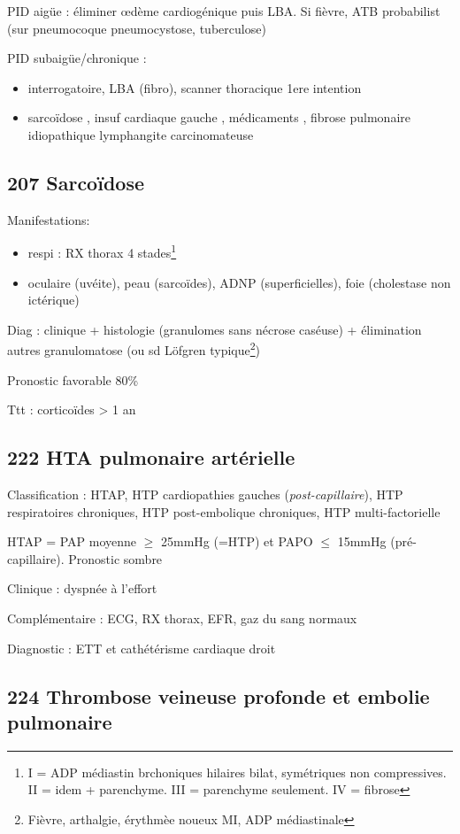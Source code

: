 \documentclass[11pt]{article}
\begin{document}
PID aigüe : éliminer \oe{}dème cardiogénique puis LBA. Si fièvre, ATB
probabilist (sur pneumocoque \textpm{} pneumocystose, tuberculose)

PID subaigüe/chronique : 
\begin{itemize}
\item interrogatoire, LBA (fibro), scanner thoracique 1ere intention
\item sarcoïdose , insuf cardiaque gauche , médicaments , fibrose pulmonaire idiopathique lymphangite carcinomateuse
\end{itemize}
\subsection{207 Sarcoïdose}
\label{sec:org4ff6054}
Manifestations: 
\begin{itemize}
\item respi : RX thorax 4 stades\footnote{I = ADP médiastin brchoniques hilaires bilat, symétriques non
compressives. II = idem + parenchyme. III = parenchyme seulement. IV = fibrose}
\item oculaire (uvéite), peau (sarcoïdes), ADNP (superficielles), foie (cholestase non ictérique)
\end{itemize}

Diag : clinique + histologie (granulomes sans nécrose caséuse) + élimination
autres granulomatose (ou sd Löfgren typique\footnote{Fièvre, arthalgie, érythmèe noueux MI, ADP médiastinale})

Pronostic favorable 80\%

Ttt : corticoïdes > 1 an 
\subsection{222 HTA pulmonaire artérielle}
\label{sec:org47e8d8f}
Classification : HTAP, HTP cardiopathies gauches (\emph{post-capillaire}), HTP respiratoires chroniques, HTP
post-embolique chroniques, HTP multi-factorielle

HTAP = PAP moyenne \(\ge\) 25mmHg (=HTP) et PAPO \(\le\) 15mmHg
(pré-capillaire). Pronostic sombre

Clinique : dyspnée à l'effort

Complémentaire : ECG, RX thorax, EFR, gaz du sang normaux

Diagnostic : ETT et cathétérisme cardiaque droit

\subsection{224 Thrombose veineuse profonde et embolie pulmonaire}
\label{sec:org9f948f0}
\end{document}
